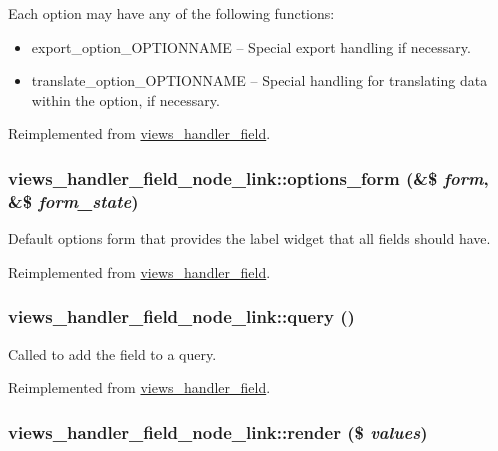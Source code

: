 Each option may have any of the following functions:\begin{itemize}
\item export\_\-option\_\-OPTIONNAME -- Special export handling if necessary.\item translate\_\-option\_\-OPTIONNAME -- Special handling for translating data within the option, if necessary. \end{itemize}


Reimplemented from \hyperlink{classviews__handler__field_64c69a8a3697603f8283405071c25b76}{views\_\-handler\_\-field}.\hypertarget{classviews__handler__field__node__link_fe6559cbf0b01700ae56fa62c5ca7616}{
\subsubsection[{options\_\-form}]{\setlength{\rightskip}{0pt plus 5cm}views\_\-handler\_\-field\_\-node\_\-link::options\_\-form (\&\$ {\em form}, \/  \&\$ {\em form\_\-state})}}
\label{classviews__handler__field__node__link_fe6559cbf0b01700ae56fa62c5ca7616}


Default options form that provides the label widget that all fields should have. 

Reimplemented from \hyperlink{classviews__handler__field_0435d161922b7b4b84f02a2e79bb947a}{views\_\-handler\_\-field}.\hypertarget{classviews__handler__field__node__link_2c9b646801f273970403fea5ac4621b0}{
\subsubsection[{query}]{\setlength{\rightskip}{0pt plus 5cm}views\_\-handler\_\-field\_\-node\_\-link::query ()}}
\label{classviews__handler__field__node__link_2c9b646801f273970403fea5ac4621b0}


Called to add the field to a query. 

Reimplemented from \hyperlink{classviews__handler__field_4f661f91bcbe80d4a00c30a31456c502}{views\_\-handler\_\-field}.\hypertarget{classviews__handler__field__node__link_9621ff38a6b318eb94f0c44fa2f711f5}{
\subsubsection[{render}]{\setlength{\rightskip}{0pt plus 5cm}views\_\-handler\_\-field\_\-node\_\-link::render (\$ {\em values})}}
\label{classviews__handler__field__node__link_9621ff38a6b318eb94f0c44fa2f711f5}


